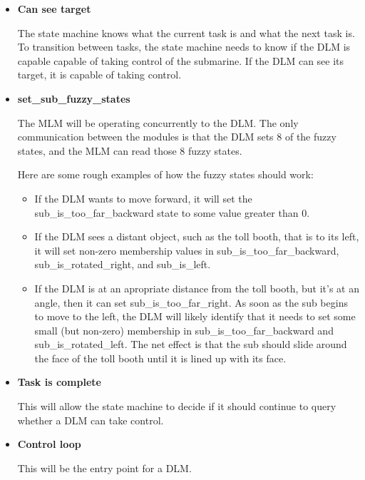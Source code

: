 \documentclass[11pt]{scrartcl}
\begin{document}
    \begin{itemize}
      \item {\bf Can see target}

        The state machine knows what the current task is and what the next task is. To transition between tasks, the state machine needs to know if the DLM is capable capable of taking control of the submarine. If the DLM can see its target, it is capable of taking control.

      \item {\bf set\_sub\_fuzzy\_states}

        The MLM will be operating concurrently to the DLM. The only communication between the modules is that the DLM sets 8 of the fuzzy states, and the MLM can read those 8 fuzzy states.

        Here are some rough examples of how the fuzzy states should work:

        \begin{itemize}
          \item
            If the DLM wants to move forward, it will set the sub\_is\_too\_far\_backward state to some value greater than 0.

          \item
            If the DLM sees a distant object, such as the toll booth, that is to its left, it will set non-zero membership values in sub\_is\_too\_far\_backward, sub\_is\_rotated\_right, and sub\_is\_left.

           \item
             If the DLM is at an apropriate distance from the toll booth, but it's at an angle, then it can set sub\_is\_too\_far\_right. As soon as the sub begins to move to the left, the DLM will likely identify that it needs to set some small (but non-zero) membership in sub\_is\_too\_far\_backward and sub\_is\_rotated\_left. The net effect is that the sub should slide around the face of the toll booth until it is lined up with its face.
         \end{itemize}

      \item {\bf Task is complete}

        This will allow the state machine to decide if it should continue to query whether a DLM can take control.

      \item {\bf Control loop}

        This will be the entry point for a DLM.
    \end{itemize}
\end{document}
